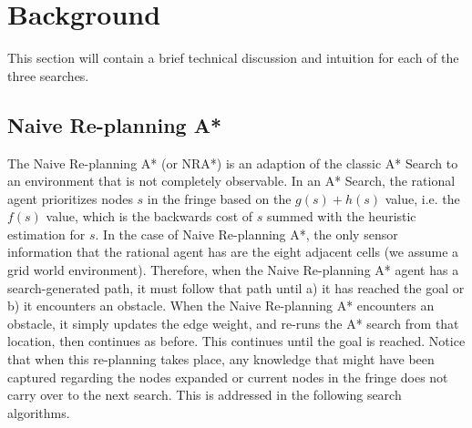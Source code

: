 

\section{Background}
	This section will contain a brief technical discussion and intuition for each of the three searches.
	\subsection{Naive Re-planning A*}
	    The Naive Re-planning A* (or NRA*) is an adaption of the classic A* Search to an environment that is not completely observable. In an A* Search, the rational agent prioritizes nodes $s$ in the fringe based on the $g(s)+h(s)$ value, i.e. the $f(s)$ value, which is the backwards cost of $s$ summed with the heuristic estimation for $s$. In the case of Naive Re-planning A*, the only sensor information that the rational agent has are the eight adjacent cells (we assume a grid world environment). Therefore, when the Naive Re-planning A* agent has a search-generated path, it must follow that path until a) it has reached the goal or b) it encounters an obstacle. When the Naive Re-planning A* encounters an obstacle, it simply updates the edge weight, and re-runs the A* search from that location, then continues as before. This continues until the goal is reached. Notice that when this re-planning takes place, any knowledge that might have been captured regarding the nodes expanded or current nodes in the fringe does not carry over to the next search. This is addressed in the following search algorithms.


